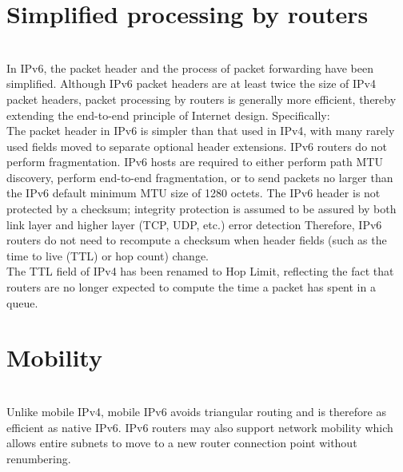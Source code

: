 \documentclass[12pt]{article}
\begin{document}
\section{Simplified processing by routers}\\
In IPv6, the packet header and the process of packet forwarding have been simplified. Although IPv6 packet headers are at least twice the size of IPv4 packet headers, packet processing by routers is generally more efficient, thereby extending the end-to-end principle of Internet design. Specifically:\\
The packet header in IPv6 is simpler than that used in IPv4, with many rarely used fields moved to separate optional header extensions.
IPv6 routers do not perform fragmentation. IPv6 hosts are required to either perform path MTU discovery, perform end-to-end fragmentation, or to send packets no larger than the IPv6 default minimum MTU size of 1280 octets.
The IPv6 header is not protected by a checksum; integrity protection is assumed to be assured by both link layer and higher layer (TCP, UDP, etc.) error detection Therefore, IPv6 routers do not need to recompute a checksum when header fields (such as the time to live (TTL) or hop count) change.\\
The TTL field of IPv4 has been renamed to Hop Limit, reflecting the fact that routers are no longer expected to compute the time a packet has spent in a queue.\\
\section{Mobility}\\
Unlike mobile IPv4, mobile IPv6 avoids triangular routing and is therefore as efficient as native IPv6. IPv6 routers may also support network mobility which allows entire subnets to move to a new router connection point without renumbering. 
\end{document}
